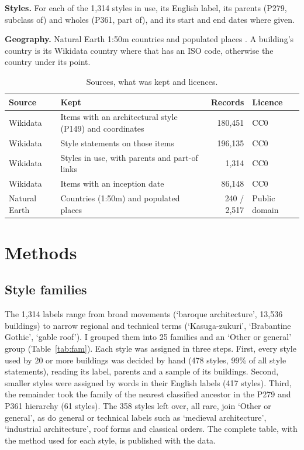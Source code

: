 \documentclass[11pt,a4paper]{article}
\begin{document}
\textbf{Styles.} For each of the 1,314 styles in use, its English label, its parents (P279, subclass of) and wholes (P361, part of), and its start and end dates where given.

\textbf{Geography.} Natural Earth 1:50m countries and populated places \citep{naturalearth}. A building's country is its Wikidata country where that has an ISO code, otherwise the country under its point.

\begin{table}[tbp]\centering\small\caption{Sources, what was kept and licences.}\label{tab:sources}\begin{tabular}{>{\raggedright\arraybackslash}p{3.0cm}>{\raggedright\arraybackslash}p{7.2cm}r>{\raggedright\arraybackslash}p{2.2cm}}\toprule Source & Kept & Records & Licence\\\midrule
Wikidata & Items with an architectural style (P149) and coordinates & 180,451 & CC0\\
Wikidata & Style statements on those items & 196,135 & CC0\\
Wikidata & Styles in use, with parents and part-of links & 1,314 & CC0\\
Wikidata & Items with an inception date & 86,148 & CC0\\
Natural Earth & Countries (1:50m) and populated places & 240 / 2,517 & Public domain\\
\bottomrule\end{tabular}\end{table}

\section{Methods}
\subsection{Style families}
The 1,314 labels range from broad movements (`baroque architecture', 13,536 buildings) to narrow regional and technical terms (`Kasuga-zukuri', `Brabantine Gothic', `gable roof'). I grouped them into 25 families and an `Other or general' group (Table~\ref{tab:fam}). Each style was assigned in three steps. First, every style used by 20 or more buildings was decided by hand (478 styles, 99\% of all style statements), reading its label, parents and a sample of its buildings. Second, smaller styles were assigned by words in their English labels (417 styles). Third, the remainder took the family of the nearest classified ancestor in the P279 and P361 hierarchy (61 styles). The 358 styles left over, all rare, join `Other or general', as do general or technical labels such as `medieval architecture', `industrial architecture', roof forms and classical orders. The complete table, with the method used for each style, is published with the data.
\end{document}
